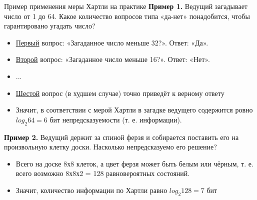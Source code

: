 \begin{frame}{Пример применения меры Хартли на практике}
\parindent=25mm
\noindent\textbf{Пример 1.}
Ведущий загадывает число от 1 до 64. Какое количество вопросов типа
«да-нет» понадобится, чтобы гарантировано угадать число?



\begin{itemize}
	\item[\textbullet] \underline{Первый} вопрос: «Загаданное число меньше 32?». Ответ: «Да».
	\item[\textbullet] \underline{Второй} вопрос: «Загаданное число меньше 16?». Ответ: «Нет».
	\item[\textbullet] ...
	\item[\textbullet] \underline{Шестой} вопрос (в худшем случае) точно приведёт к верному ответу
	\item[\textbullet] Значит, в соответствии с мерой Хартли в загадке ведущего содержится ровно $log_2 64 = 6$ бит непредсказуемости (т. е. информации).
\end{itemize}

\noindent\textbf{Пример 2.}
Ведущий держит за спиной ферзя и собирается поставить его на
произвольную клетку доски. Насколько непредсказуемо его решение?
\begin{itemize}
	\item[\textbullet] Всего на доске 8х8 клеток, а цвет ферзя может быть белым или чёрным, т. е.
	всего возможно 8х8х2 = 128 равновероятных состояний. 

	\item[\textbullet] Значит, количество информации по Хартли равно
	$log_2 128 = 7$ бит
\end{itemize}

\end{frame}